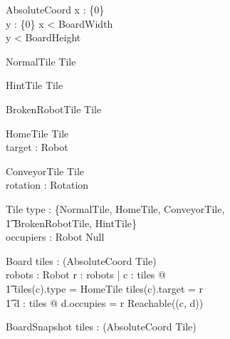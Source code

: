 \documentclass[12pt]{article}
\begin{document}
\begin{schema}{AbsoluteCoord}
x : \nat \cup \{0\} \\
y : \nat \cup \{0\}
\where
x < BoardWidth \\
y < BoardHeight
\end{schema}


\begin{schema}{NormalTile}
Tile
\end{schema}

\begin{schema}{HintTile}
Tile
\end{schema}

\begin{schema}{BrokenRobotTile}
Tile
\end{schema}

\begin{schema}{HomeTile}
Tile \\
target : Robot
\end{schema}

\begin{schema}{ConveyorTile}
Tile \\
rotation : Rotation
\end{schema}

\begin{schema}{Tile}
type : \{NormalTile, HomeTile, ConveyorTile, \\ \t1 BrokenRobotTile, HintTile\} \\
occupiers : Robot \cup Null
\end{schema}

\begin{schema}{Board}
tiles : \power (AbsoluteCoord \fun Tile) \\
robots : \power Robot
\where
\forall r : robots | \exists c : \dom tiles @  \\ \t1 tiles(c).type = HomeTile \wedge tiles(c).target = r \wedge \\ \t1
\exists d : \dom tiles @ d.occupies = r \wedge Reachable((c, d))
\end{schema}

\begin{schema}{BoardSnapshot}
tiles : \power (AbsoluteCoord \fun Tile) \\
\end{schema}
\end{document}
